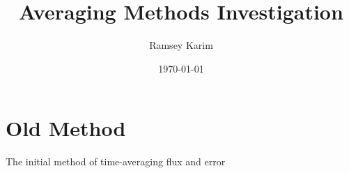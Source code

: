\documentclass{article}
\title{Averaging Methods Investigation}
\author{Ramsey Karim}
\date{\today}
\begin{document}
\maketitle

\section{Old Method}
The initial method of time-averaging flux and error 
\end{document}
